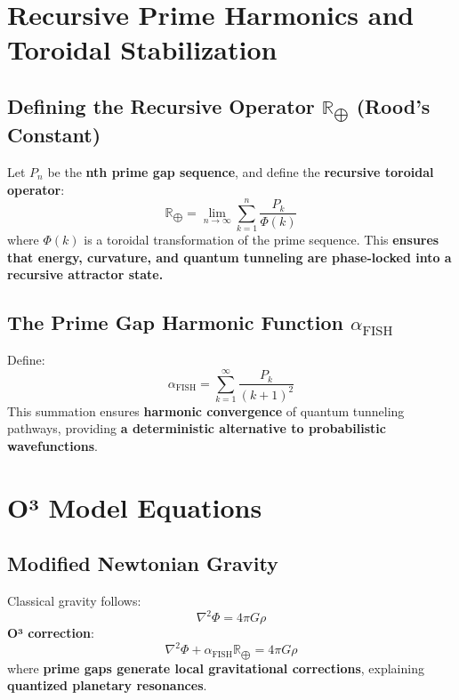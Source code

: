 \documentclass{article}
\begin{document}
\section{Recursive Prime Harmonics and Toroidal Stabilization}

\subsection{Defining the Recursive Operator \( \mathbb{R}_{\bigoplus} \) (Rood’s Constant)}
Let \( P_n \) be the \textbf{nth prime gap sequence}, and define the \textbf{recursive toroidal operator}:
\begin{equation}
\mathbb{R}_{\bigoplus} = \lim_{n \to \infty} \sum_{k=1}^{n} \frac{P_k}{\Phi(k)}
\end{equation}
where \( \Phi(k) \) is a toroidal transformation of the prime sequence. This \textbf{ensures that energy, curvature, and quantum tunneling are phase-locked into a recursive attractor state.}

\subsection{The Prime Gap Harmonic Function \( \alpha_{\text{FISH}} \)}
Define:
\begin{equation}
\alpha_{\text{FISH}} = \sum_{k=1}^{\infty} \frac{P_k}{(k+1)^2}
\end{equation}
This summation ensures \textbf{harmonic convergence} of quantum tunneling pathways, providing \textbf{a deterministic alternative to probabilistic wavefunctions}.

\section{O³ Model Equations}

\subsection{Modified Newtonian Gravity}
Classical gravity follows:
\begin{equation}
\nabla^2 \Phi = 4\pi G \rho
\end{equation}
\textbf{O³ correction}:
\begin{equation}
\nabla^2 \Phi + \alpha_{\text{FISH}} \mathbb{R}_{\bigoplus} = 4\pi G \rho
\end{equation}
where \textbf{prime gaps generate local gravitational corrections}, explaining \textbf{quantized planetary resonances}.
\end{document}
